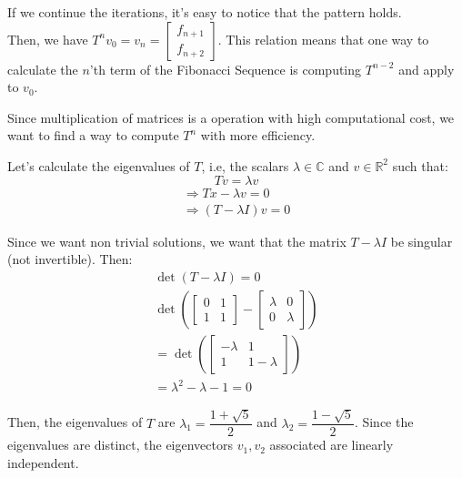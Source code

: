 \documentclass{article}
\begin{document}
If we continue the iterations, it's easy to notice that the pattern holds.\\
Then, we have $T^n v_0 = v_n = \begin{bmatrix}
    f_{n+1}\\
    f_{n + 2}
\end{bmatrix}$. This relation means that one way to calculate the $n$'th term
of the Fibonacci Sequence is computing $T^{n - 2}$ and apply to $v_0$.

Since multiplication of matrices is a operation with high computational cost,
we want to find a way to compute $T^n$ with more efficiency.

Let's calculate the eigenvalues of $T$, i.e, the scalars
$\lambda \in \mathbb{C}$ and $v \in \mathbb{R}^2$ such that:
    \begin{equation}
        Tv = \lambda v
    \end{equation}
\begin{equation*}
    \begin{aligned}
        \Rightarrow Tx - \lambda v = 0\\
        \Rightarrow (T - \lambda I)v = 0
    \end{aligned}
\end{equation*}


Since we want non trivial solutions, we want that the matrix $T - \lambda I$ be
singular (not invertible). Then:
\begin{equation*}
    \begin{aligned}
    \det(T - \lambda I) = 0\\
    \det(\begin{bmatrix}
        0 & 1 \\
        1 & 1
    \end{bmatrix} - \begin{bmatrix}
        \lambda & 0\\
        0 & \lambda
    \end{bmatrix})\\
    =\det(\begin{bmatrix}
        -\lambda & 1\\
        1 & 1 - \lambda
    \end{bmatrix})\\
    = \lambda^2 - \lambda - 1 = 0
    \end{aligned}
\end{equation*}

Then, the eigenvalues of $T$ are $\lambda_1 = \dfrac{1 + \sqrt{5}}{2}$ and
$\lambda_2 = \dfrac{1 - \sqrt{5}}{2}$. Since the eigenvalues are distinct, the
eigenvectors $v_1, v_2$ associated are linearly independent.
\end{document}
